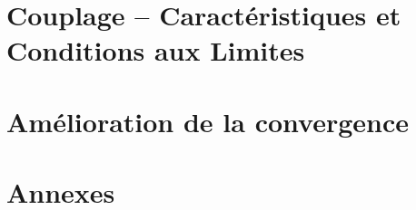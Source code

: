 \documentclass[a4paper, 11pt, twoside]{report}
\begin{document}
\part{Couplage -- Caractéristiques et Conditions aux Limites}
\label{part:couplage}
\newpage\thispagestyle{empty}\null\newpage
\addtocounter{page}{-2}
\setcounter{section}{0}


\part{Amélioration de la convergence}
\label{part:convergence}
\newpage\thispagestyle{empty}\null\newpage
\addtocounter{page}{-2}
\setcounter{section}{0}



\clearpage



\nocite{*}



\appendix
\part*{Annexes}
\newpage\thispagestyle{empty}\null\newpage
\addtocounter{page}{-2}


\end{document}
